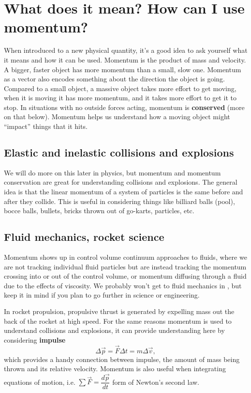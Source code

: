\documentclass[handout]{tufte-handout}
\begin{document}
\section{What does it mean? How can I use momentum?}
When introduced to a new physical quantity, it's a good idea to ask yourself what it means and how it can be used. Momentum is the product of mass and velocity. A bigger, faster object has more momentum than a small, slow one. Momentum as a vector also encodes something about the direction the object is going. Compared to a small object, a massive object takes more effort to get moving, when it is moving it has more momentum, and it takes more effort to get it to stop.  In situations with no outside forces acting, momentum is \textbf{conserved} (more on that below). Momentum helps us understand how a moving object might ``impact'' things that it hits. 

\subsection{Elastic and inelastic collisions and explosions}
We will do more on this later in physics, but momentum and momentum conservation are great for understanding collisions and explosions. The general idea is that the linear momentum of a system of particles is the same before and after they collide. This is useful in considering things like billiard balls (pool), bocce balls, bullets, bricks thrown out of go-karts, particles, etc. 

\subsection{Fluid mechanics, rocket science}
Momentum shows up in control volume continuum approaches to fluids, where we are not tracking individual fluid particles but are instead tracking the momentum crossing into or out of the control volume, or momentum diffusing through a fluid due to the effects of viscosity. We probably won't get to fluid mechanics in \mobeardCourseName, but keep it in mind if you plan to go further in science or engineering. 

In rocket propulsion, propulsive thrust is generated by expelling mass out the back of the rocket at high speed. For the same reasons momentum is used to understand collisions and explosions, it can provide understanding here by considering \textbf{impulse} 
\begin{equation}
\Delta \vec{p} = \vec{F} \Delta t = m \Delta \vec{v},
\end{equation}
which provides a handy connection between impulse, the amount of mass being thrown and its relative velocity. Momentum is also useful when integrating equations of motion, i.e. $\sum\vec{F} = \dfrac{d\vec{p}}{dt}$ form of Newton's second law. 
\end{document}
